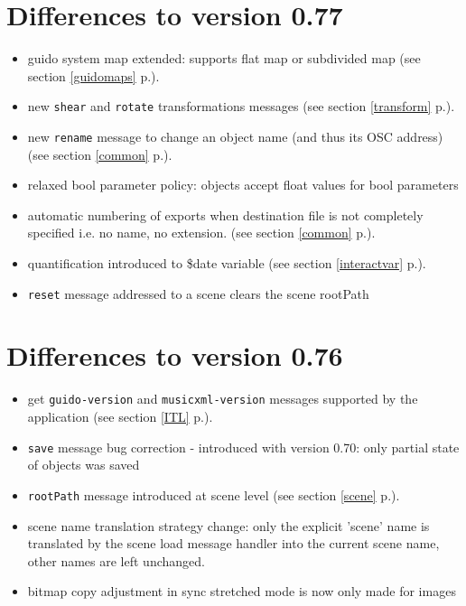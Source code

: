 \documentclass[a4paper,twoside]{report}
\newcommand{\sublevel}[1]	{\section{#1}}
\newcommand{\fullref}[1]	{\ref{#1} p.\pageref{#1}}
\newcommand{\OSC}[1]		{\texttt{#1}}
\begin{document}
\sublevel{Differences to version 0.77}
\begin{itemize}
\item guido system map extended: supports flat map or subdivided map (see section \fullref{guidomaps}).
\item new \OSC{shear} and \OSC{rotate} transformations messages (see section \fullref{transform}).
\item new \OSC{rename} message to change an object name (and thus its OSC address) (see section \fullref{common}).
\item relaxed bool parameter policy: objects accept float values for bool parameters 
\item automatic numbering of exports when destination file is not completely specified 
  i.e. no name, no extension. (see section \fullref{common}).
\item quantification introduced to \$date variable (see section \fullref{interactvar}).
\item \OSC{reset} message addressed to a scene clears the scene rootPath
\end{itemize}

\sublevel{Differences to version 0.76}
\begin{itemize}
\item  get \OSC{guido-version} and \OSC{musicxml-version} messages supported by the application (see section \fullref{ITL}).
\item  \OSC{save} message bug correction - introduced with version 0.70: only partial state of objects was saved
\item  \OSC{rootPath} message introduced at scene level (see section \fullref{scene}).
\item  scene name translation strategy change: only the explicit 'scene' name is 
  translated by the scene load message handler into the current scene name, 
  other names are left unchanged.
\item  bitmap copy adjustment in sync stretched mode is now only made for images
\end{itemize}
\end{document}
